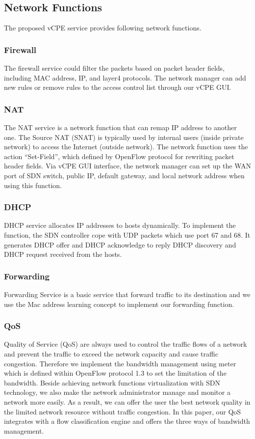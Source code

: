 \documentclass[journal]{IEEEtran}
\begin{document}
\subsection{Network Functions}
The proposed vCPE service provides following network functions.

\subsubsection{Firewall}
The firewall service could filter the packets based on packet header fields, including MAC address, IP, and layer4 protocols. The network manager can add new rules or remove rules to the access control list through our vCPE GUI.

\subsubsection{NAT}
The NAT service is a network function that can remap  IP address to another one. The Source NAT (SNAT) is typically used by internal users (inside private network) to access the Internet (outside network). The network function uses the action “Set-Field”, which defined by OpenFlow protocol for rewriting packet header fields. Via vCPE GUI interface, the network manager can set up the WAN port of SDN switch, public IP, default gateway, and local network address when using this function.

\subsubsection{DHCP}
DHCP service allocates IP addresses to hosts dynamically. To implement the function, the SDN controller cope with UDP packets which use port 67 and 68. It generates DHCP offer and DHCP acknowledge to reply DHCP discovery and DHCP request received from the hosts.

\subsubsection{Forwarding}
Forwarding Service is a basic service that forward traffic to its destination and we use the Mac address learning concept to implement our forwarding function.

\subsubsection{QoS}
Quality of Service (QoS) are always used to control the traffic flows of a network and prevent the traffic to exceed the network capacity and cause traffic congestion. Therefore we implement the bandwidth management using meter which is defined within OpenFlow protocol 1.3 to set the limitation of the bandwidth.
Beside achieving network functions virtualization with SDN technology, we also make the network administrator manage and monitor a network more easily. As a result, we can offer the user the best network quality in the limited network resource without traffic congestion.
In this paper, our QoS integrates with a flow classification engine and offers the three ways of bandwidth management.
\end{document}
